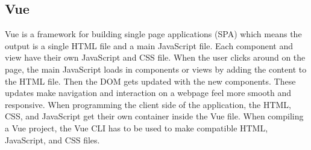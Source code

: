 \subsection{Vue}
Vue\cite{VUE} is a framework for building single page applications (SPA) which means the output is a single HTML file and a main JavaScript file. Each component and view have their own JavaScript and CSS file. When the user clicks around on the page, the main JavaScript loads in components or views by adding the content to the HTML file. Then the DOM gets updated with the new components. These updates make navigation and interaction on a webpage feel more smooth and responsive. When programming the client side of the application, the HTML, CSS, and JavaScript get their own container inside the Vue file. When compiling a Vue project, the Vue CLI has to be used to make compatible HTML, JavaScript, and CSS files.





